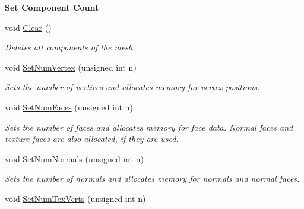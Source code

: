 \begin{Indent}\textbf{ Set Component Count}\par
\begin{DoxyCompactItemize}
\item 
\mbox{\label{classcy_1_1_tri_mesh_ae2a0cecd7da333e31d4ff855215467b8}} 
void \mbox{\hyperlink{classcy_1_1_tri_mesh_ae2a0cecd7da333e31d4ff855215467b8}{Clear}} ()
\begin{DoxyCompactList}\small\item\em Deletes all components of the mesh. \end{DoxyCompactList}\item 
\mbox{\label{classcy_1_1_tri_mesh_a5111afec31edabbc6a665bacf02e67fe}} 
void \mbox{\hyperlink{classcy_1_1_tri_mesh_a5111afec31edabbc6a665bacf02e67fe}{Set\+Num\+Vertex}} (unsigned int n)
\begin{DoxyCompactList}\small\item\em Sets the number of vertices and allocates memory for vertex positions. \end{DoxyCompactList}\item 
\mbox{\label{classcy_1_1_tri_mesh_a6871200c8950a45c3bd8f6bf1bc76827}} 
void \mbox{\hyperlink{classcy_1_1_tri_mesh_a6871200c8950a45c3bd8f6bf1bc76827}{Set\+Num\+Faces}} (unsigned int n)
\begin{DoxyCompactList}\small\item\em Sets the number of faces and allocates memory for face data. Normal faces and texture faces are also allocated, if they are used. \end{DoxyCompactList}\item 
\mbox{\label{classcy_1_1_tri_mesh_aae2471b77847c8a15ec42ea4bcd4355e}} 
void \mbox{\hyperlink{classcy_1_1_tri_mesh_aae2471b77847c8a15ec42ea4bcd4355e}{Set\+Num\+Normals}} (unsigned int n)
\begin{DoxyCompactList}\small\item\em Sets the number of normals and allocates memory for normals and normal faces. \end{DoxyCompactList}\item 
\mbox{\label{classcy_1_1_tri_mesh_afcd5630009a54c86b414d4c9ab15dca0}} 
void \mbox{\hyperlink{classcy_1_1_tri_mesh_afcd5630009a54c86b414d4c9ab15dca0}{Set\+Num\+Tex\+Verts}} (unsigned int n)

\end{DoxyCompactItemize}
\end{Indent}
